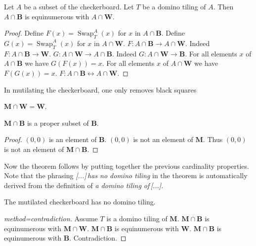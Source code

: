 \documentclass[english]{article}
\newcommand{\Mutilated}{\mathbf{M}}
\newcommand{\Black}{\mathbf{B}}
\newcommand{\White}{\mathbf{W}}
\newcommand{\Sw}[3]{\operatorname{Swap}_{#1}^{#2}(#3)}
\begin{document}
\begin{forthel}
    \begin{lemma}
        Let $A$ be a subset of the checkerboard.
        Let $T$ be a domino tiling of $A$.
        Then $A \cap \Black$ is
        equinumerous with $A \cap \White$.
    \end{lemma}
    \begin{proof}
        Define $F(x) = \Sw{T}{A}{x}$ for $x$ in $A \cap \Black$.
        Define $G(x) = \Sw{T}{A}{x}$ for $x$ in $A \cap \White$.
        $F: A \cap \Black \to A \cap \White$.
        Indeed  $F: A \cap \Black \to \White$.
        $G: A \cap \White \to A \cap \Black$.
        Indeed  $G: A \cap \White \to \Black$.
        For all elements $x$ of $A \cap \Black$ we have $G(F(x))=x$.
        For all elements $x$ of $A \cap \White$ we have $F(G(x))=x$.
        $F : A \cap \Black \leftrightarrow A \cap \White$.
    \end{proof}
\end{forthel}

\noindent In mutilating the checkerboard, one only removes black squares

\begin{forthel}
  \begin{lemma}
      $\Mutilated \cap \White = \White$.
  \end{lemma}

\begin{lemma}
    $\Mutilated\cap\Black$ is a proper subset of $\Black$.
\end{lemma}
\begin{proof}
    $(0,0)$ is an element of $\Black$.
    $(0,0)$ is not an element of $\Mutilated$.
    Thus $(0,0)$ is not an element of $\Mutilated\cap \Black$.
\end{proof}
\end{forthel}

\noindent Now the theorem follows by putting together the previous cardinality properties.
Note that the phrasing \textit{[...]\,has no domino tiling} in the theorem is automatically
derived from the definition of \textit{a domino tiling of\,[...]}.

\begin{forthel}
    \begin{theorem}
        The mutilated checkerboard has no domino tiling.
    \end{theorem}
    \begin{proof}[method=contradiction]
        Assume $T$ is a domino tiling of $\Mutilated$.
        $\Mutilated \cap \Black$ is equinumerous with $\Mutilated \cap \White$.
        $\Mutilated \cap \Black$ is equinumerous with $\White$.
        $\Mutilated \cap \Black$ is equinumerous with $\Black$.
        Contradiction.
    \end{proof}
\end{forthel}
\end{document}
